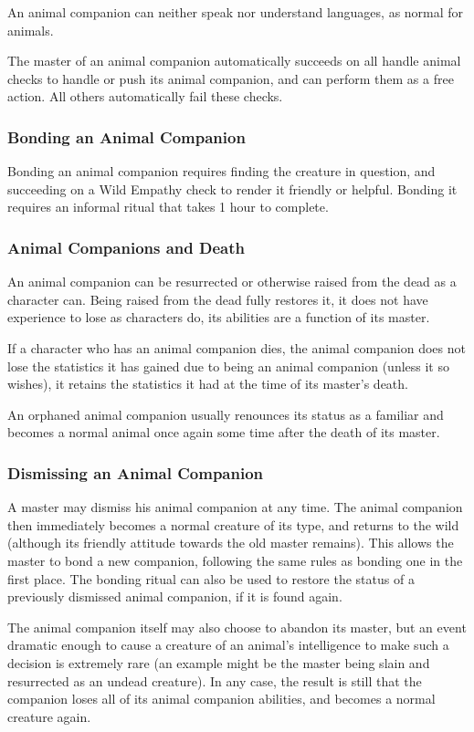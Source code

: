 An animal companion can neither speak nor understand languages, as normal for animals.

The master of an animal companion automatically succeeds on all handle animal checks to handle or push its animal companion, 
and can perform them as a free action.
All others automatically fail these checks.
\subsubsection{Bonding an Animal Companion}
Bonding an animal companion requires finding the creature in question, and succeeding on a Wild Empathy check to render it friendly or helpful.
Bonding it requires an informal ritual that takes 1 hour to complete.
\subsubsection{Animal Companions and Death}
An animal companion can be resurrected or otherwise raised from the dead as a character can. 
Being raised from the dead fully restores it, it does not have experience to lose as characters do, its abilities are a function of its master.

If a character who has an animal companion dies, 
the animal companion does not lose the statistics it has gained due to being an animal companion (unless it so wishes), 
it retains the statistics it had at the time of its master's death.

An orphaned animal companion usually renounces its status as a familiar and becomes a normal animal once again some time after the death of its master.
\subsubsection{Dismissing an Animal Companion}
A master may dismiss his animal companion at any time. 
The animal companion then immediately becomes a normal creature of its type, and returns to the wild 
(although its friendly attitude towards the old master remains).
This allows the master to bond a new companion, following the same rules as bonding one in the first place.
The bonding ritual can also be used to restore the status of a previously dismissed animal companion, if it is found again.

The animal companion itself may also choose to abandon its master, 
but an event dramatic enough to cause a creature of an animal's intelligence to make such a decision is extremely rare
(an example might be the master being slain and resurrected as an undead creature).
In any case, the result is still that the companion loses all of its animal companion abilities, and becomes a normal creature again.
